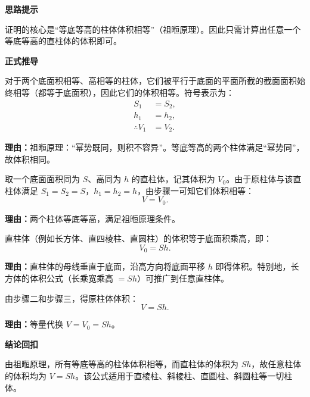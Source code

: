 \begin{proofbox}
	\textbf{\textcolor{CProof}{思路提示}}

	证明的核心是“等底等高的柱体体积相等”（祖暅原理）。因此只需计算出任意一个等底等高的直柱体的体积即可。

	\medskip
	\textbf{\textcolor{CProof}{正式推导}}
	\begin{description}[style=nextline, leftmargin=2.8em, labelsep=0.5em, itemsep=0.55em]
		\item[\textbf{步骤一（祖暅原理）：}] 对于两个底面积相等、高相等的柱体，它们被平行于底面的平面所截的截面面积始终相等（都等于底面积），因此它们的体积相等。符号表示为：
			\[
				\begin{aligned}
					S_1 &= S_2,\\
					h_1 &= h_2,\\
					\therefore V_1 &= V_2.
			\end{aligned}
			\]
			\par\textbf{理由：}祖暅原理：“幂势既同，则积不容异”。等底等高的两个柱体满足“幂势同”，故体积相同。

		\item[\textbf{步骤二（构造等积柱体）：}] 取一个底面面积同为 $S$、高同为 $h$ 的直柱体，记其体积为 $V_0$。由于原柱体与该直柱体满足 $S_1=S_2=S$，$h_1=h_2=h$，由步骤一可知它们体积相等：
			\[
				V = V_0.
			\]
			\par\textbf{理由：}两个柱体等底等高，满足祖暅原理条件。

		\item[\textbf{步骤三（直柱体体积公式）：}] 直柱体（例如长方体、直四棱柱、直圆柱）的体积等于底面积乘高，即：
			\[
				V_0 = S h.
			\]
			\par\textbf{理由：}直柱体的母线垂直于底面，沿高方向将底面平移 $h$ 即得体积。特别地，长方体的体积公式（长乘宽乘高 $= S h$）可推广到任意直柱体。

		\item[\textbf{步骤四（统一公式）：}] 由步骤二和步骤三，得原柱体体积：
			\[
				V = S h.
			\]
			\par\textbf{理由：}等量代换 $V = V_0 = Sh$。
	\end{description}

	\medskip
	\textbf{\textcolor{CProof}{结论回扣}}

	由祖暅原理，所有等底等高的柱体体积相等，而直柱体的体积为 $S h$，故任意柱体的体积均为 $V = S h$。该公式适用于直棱柱、斜棱柱、直圆柱、斜圆柱等一切柱体。
\end{proofbox}
